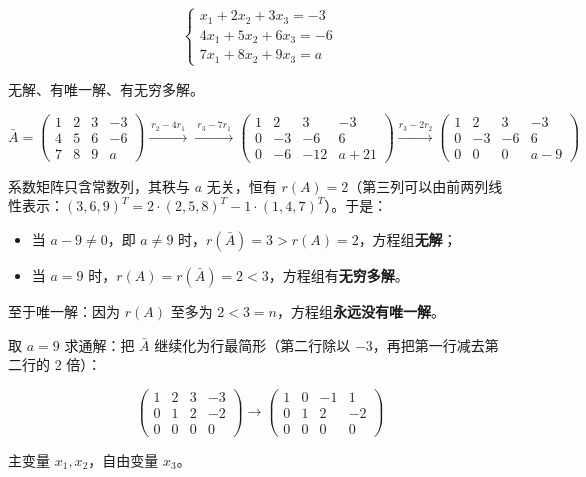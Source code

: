 \documentclass[11pt,openany,UTF8]{ctexbook}
\begin{document}
\[\begin{cases} x_1+2x_2+3x_3=-3 \\ 4x_1+5x_2+6x_3=-6 \\ 7x_1+8x_2+9x_3=a \end{cases}\]

无解、有唯一解、有无穷多解。

\[\bar A=\begin{pmatrix} 1 & 2 & 3 & -3 \\ 4 & 5 & 6 & -6 \\ 7 & 8 & 9 & a \end{pmatrix}
\xrightarrow{\ r_2-4r_1\ }\xrightarrow{\ r_3-7r_1\ }
\begin{pmatrix} 1 & 2 & 3 & -3 \\ 0 & -3 & -6 & 6 \\ 0 & -6 & -12 & a+21 \end{pmatrix}
\xrightarrow{r_3-2r_2}
\begin{pmatrix} 1 & 2 & 3 & -3 \\ 0 & -3 & -6 & 6 \\ 0 & 0 & 0 & a-9 \end{pmatrix}\]

系数矩阵只含常数列，其秩与 $a$ 无关，恒有 $r(A)=2$（第三列可以由前两列线性表示：$(3,6,9)^T=2\cdot(2,5,8)^T-1\cdot(1,4,7)^T$）。于是：

\begin{itemize}
\item 当 $a-9\ne0$，即 $a\ne9$ 时，$r(\bar A)=3>r(A)=2$，方程组\textbf{无解}；
\item 当 $a=9$ 时，$r(A)=r(\bar A)=2<3$，方程组有\textbf{无穷多解}。
\end{itemize}
至于唯一解：因为 $r(A)$ 至多为 $2<3=n$，方程组\textbf{永远没有唯一解}。

取 $a=9$ 求通解：把 $\bar A$ 继续化为行最简形（第二行除以 $-3$，再把第一行减去第二行的 $2$ 倍）：

\[\begin{pmatrix} 1 & 2 & 3 & -3 \\ 0 & 1 & 2 & -2 \\ 0 & 0 & 0 & 0 \end{pmatrix}
\longrightarrow
\begin{pmatrix} 1 & 0 & -1 & 1 \\ 0 & 1 & 2 & -2 \\ 0 & 0 & 0 & 0 \end{pmatrix}\]

主变量 $x_1,x_2$，自由变量 $x_3$。
\end{document}

